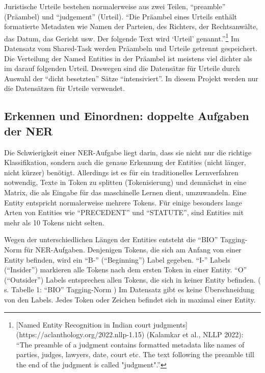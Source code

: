 \documentclass[paper=A4, ngerman, fontsize=12pt]{article}
\begin{document}
	\indent
	Juristische Urteile bestehen normalerweise aus zwei Teilen, \enquote{preamble} (Präambel) und \enquote{judgement} (Urteil). \enquote{Die Präambel eines Urteils enthält formatierte Metadaten wie Namen der Parteien, des Richters, der Rechtsanwälte, das Datum, das Gericht usw. Der folgende Text wird \enquote{Urteil} genannt.}\footnote{[Named Entity Recognition in Indian court judgments](https://aclanthology.org/2022.nllp-1.15) (Kalamkar et al., NLLP 2022): \enquote{The preamble of a judgment contains formatted metadata like names of parties, judges, lawyers, date, court etc. The text following the preamble till the end of the judgment is called "judgment".}} Im Datensatz vom Shared-Task werden Präambeln und Urteile getrennt gespeichert. Die Verteilung der Named Entities in der Präambel ist meistens viel dichter als im darauf folgenden Urteil. Deswegen sind die Datensätze für Urteile durch Auswahl der \enquote{dicht besetzten} Sätze \enquote{intensiviert}. In diesem Projekt werden nur die Datensätzen für Urteile verwendet. 
	
	\subsection{Erkennen und Einordnen: doppelte Aufgaben der NER}
	\noindent
	Die Schwierigkeit einer NER-Aufgabe liegt darin, dass sie nicht nur die richtige Klassifikation, sondern auch die genaue Erkennung der Entities (nicht länger, nicht kürzer) benötigt. Allerdings ist es für ein traditionelles Lernverfahren notwendig, Texte in Token zu splitten (Tokenisierung) und demnächst in eine Matrix, die als Eingabe für das maschinelle Lernen dient, umzuwandeln. Eine Entity entspricht normalerweise mehrere Tokens. Für einige besonders lange Arten von Entities wie \enquote{PRECEDENT} und \enquote{STATUTE}, sind Entities mit mehr als 10 Tokens  nicht selten. 
	
	\indent
	Wegen der unterschiedlichen Längen der Entities entsteht die \enquote{BIO} Tagging-Norm für NER-Aufgaben. Denjenigen Tokens, die sich am Anfang von einer Entity befinden, wird ein \enquote{B-} (\enquote{Beginning}) Label gegeben. \enquote{I-} Labels (\enquote{Insider}) markieren alle Tokens nach dem ersten Token in einer Entity. \enquote{O} (\enquote{Outsider}) Labels entsprechen allen Tokens, die sich in keiner Entity befinden. ( s. Tabelle 1: \enquote{BIO} Tagging-Norm ) Im Datensatz gibt es keine Überschneidung von den Labels. Jedes Token oder Zeichen befindet sich in maximal einer Entity.
	
\end{document}
